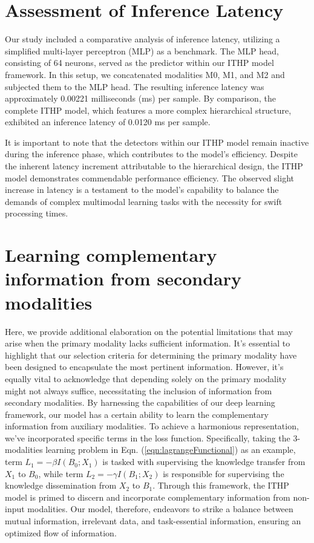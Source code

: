 \documentclass{article} %
\begin{document}
\section{Assessment of Inference Latency}

Our study included a comparative analysis of inference latency, utilizing a simplified multi-layer perceptron (MLP) as a benchmark. The MLP head, consisting of 64 neurons, served as the predictor within our ITHP model framework. In this setup, we concatenated modalities M0, M1, and M2 and subjected them to the MLP head. The resulting inference latency was approximately 0.00221 milliseconds (ms) per sample. By comparison, the complete ITHP model, which features a more complex hierarchical structure, exhibited an inference latency of 0.0120 ms per sample.

It is important to note that the detectors within our ITHP model remain inactive during the inference phase, which contributes to the model's efficiency. Despite the inherent latency increment attributable to the hierarchical design, the ITHP model demonstrates commendable performance efficiency. The observed slight increase in latency is a testament to the model's capability to balance the demands of complex multimodal learning tasks with the necessity for swift processing times.


\section{Learning complementary information from secondary modalities}
\label{apsec:limits}
Here, we provide additional elaboration on the potential limitations that may arise when the primary modality lacks sufficient information. It's essential to highlight that our selection criteria for determining the primary modality have been designed to encapsulate the most pertinent information. However, it's equally vital to acknowledge that depending solely on the primary modality might not always suffice, necessitating the inclusion of information from secondary modalities. By harnessing the capabilities of our deep learning framework, our model has a certain ability to learn the complementary information from auxiliary modalities. To achieve a harmonious representation, we've incorporated specific terms in the loss function. Specifically, taking the 3-modalities learning problem in Eqn. (\ref{eqn:lagrangeFunctional}) as an example, term $L_1=- \beta I \left (B_{0};X_{1} \right )$ is tasked with supervising the knowledge transfer from $X_1$ to $B_0$, while term $L_2=- \gamma I \left(B_{1};X_{2} \right)$ is responsible for supervising the knowledge dissemination from $X_2$ to $B_1$. Through this framework, the ITHP model is primed to discern and incorporate complementary information from non-input modalities. Our model, therefore, endeavors to strike a balance between mutual information, irrelevant data, and task-essential information, ensuring an optimized flow of information.
\end{document}

